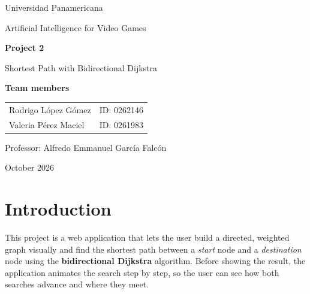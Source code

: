 \documentclass[11pt,letterpaper]{article}
\begin{document}
\begin{titlepage}
  \centering
  \vspace*{1cm}
  {\Large Universidad Panamericana\par}
  \vspace{0.4cm}
  {\large Artificial Intelligence for Video Games\par}
  \vspace{2.5cm}
  {\Huge\bfseries Project 2\par}
  \vspace{0.5cm}
  {\LARGE Shortest Path with Bidirectional Dijkstra\par}
  \vspace{3cm}

  {\large\bfseries Team members\par}
  \vspace{0.4cm}
  {\large
  \begin{tabular}{ll}
    Rodrigo López Gómez {\hspace{3cm}}& ID:  0262146\\[0.3cm]
    Valeria Pérez Maciel{\hspace{3cm}} & ID: 0261983 \\
  \end{tabular}\par}

  \vspace{2.5cm}
  {\large Professor: Alfredo Emmanuel García Falcón{\hspace{6cm}}\par}
  \vfill
  {\large October 2026\par}
\end{titlepage}

\tableofcontents
\newpage

\section{Introduction}

This project is a web application that lets the user build a directed,
weighted graph visually and find the shortest path between a \emph{start}
node and a \emph{destination} node using the \textbf{bidirectional Dijkstra}
algorithm. Before showing the result, the application animates the search
step by step, so the user can see how both searches advance and where they
meet.
\end{document}
